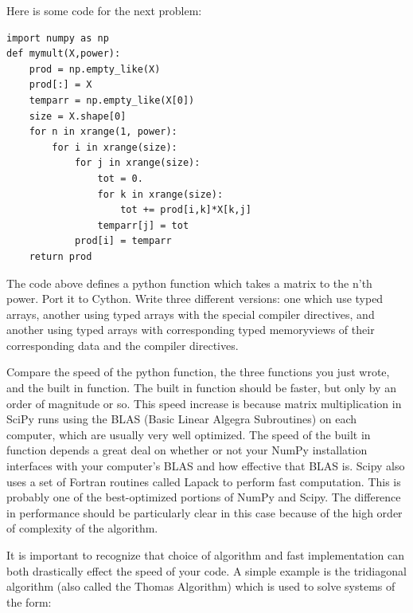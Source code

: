 \begin{problem}
Here is some code for the next problem:
\begin{lstlisting}
import numpy as np
def mymult(X,power):
    prod = np.empty_like(X)
    prod[:] = X
    temparr = np.empty_like(X[0])
    size = X.shape[0]
    for n in xrange(1, power):
        for i in xrange(size):
            for j in xrange(size):
                tot = 0.
                for k in xrange(size):
                    tot += prod[i,k]*X[k,j]
                temparr[j] = tot
            prod[i] = temparr
    return prod
\end{lstlisting}

The code above defines a python function which takes a matrix to the n'th power.
Port it to Cython. Write three different versions: one which use typed arrays, another using typed arrays with the special compiler directives, and another using typed arrays with corresponding typed memoryviews of their corresponding data and the compiler directives.

Compare the speed of the python function, the three functions you just wrote, and the built in  function.
The built in function should be faster, but only by an order of magnitude or so.
This speed increase is because matrix multiplication in SciPy runs using the BLAS (Basic Linear Algegra Subroutines) on each computer, which are usually very well optimized.
The speed of the built in function depends a great deal on whether or not your NumPy installation interfaces with your computer's BLAS and how effective that BLAS is.
Scipy also uses a set of Fortran routines called Lapack to perform fast computation.
This is probably one of the best-optimized portions of NumPy and Scipy.
The difference in performance should be particularly clear in this case because of the high order of complexity of the algorithm.
\end{problem}

It is important to recognize that choice of algorithm and fast implementation can both drastically effect the speed of your code.
A simple example is the tridiagonal algorithm (also called the Thomas Algorithm) which is used to solve systems of the form:

